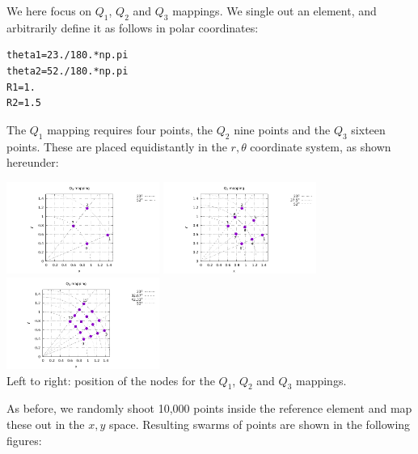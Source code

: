 We here focus on $Q_1$, $Q_2$ and $Q_3$ mappings. We single out an element, 
and arbitrarily define it as follows in polar coordinates:
\begin{lstlisting}
theta1=23./180.*np.pi
theta2=52./180.*np.pi
R1=1.
R2=1.5
\end{lstlisting}
The $Q_1$ mapping requires four points, the $Q_2$ nine points and the $Q_3$
sixteen points. These are placed equidistantly in the $r,\theta$ coordinate
system, as shown hereunder:

\begin{center}
\includegraphics[width=5cm]{images/mappings/curved/nodesQ1.pdf}
\includegraphics[width=5cm]{images/mappings/curved/nodesQ2.pdf}
\includegraphics[width=5cm]{images/mappings/curved/nodesQ3.pdf}\\
{\captionfont Left to right: position of the nodes for the $Q_1$, $Q_2$ and $Q_3$ mappings.}
\end{center}

As before, we randomly shoot 10,000 points inside the reference element 
and map these out in the $x,y$ space. Resulting swarms of points are shown 
in the following figures:

